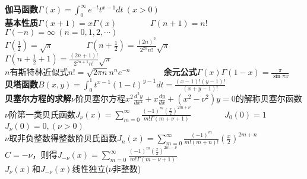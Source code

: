 \documentclass[10pt,a4paper]{article}
\begin{document}
\begin{multicols}{2}
\textbf{伽马函数}$\Gamma(x)=\int_0^{\infty}e^{-t}t^{x-1}dt~(x>0)$\\
\indent\textbf{基本性质}$\Gamma(x+1)=x\Gamma(x)$~~~~~~~~$\Gamma(n+1)=n!$~~~~~~~~$\Gamma(-n)=\infty~(n=0,1,2,\cdots)$\\
\indent\indent$\Gamma(\frac{1}{2})=\sqrt{\pi}$~~~~~~~~$\Gamma(n+\frac{1}{2})=\frac{(2n)^2}{2^{2n}n!}\sqrt{\pi}$~~~~~~~~$\Gamma(n+\frac{1}{2}+1)=\frac{(2n+1)!}{2^{2n+1}n!}\sqrt{\pi}$\\
\indent{}$n$有斯特林近似式$n!=\sqrt{2\pi n}n^ne^{-n}$~~~~~~~~\textbf{余元公式}$\Gamma(x)\Gamma(1-x)=\frac{\pi}{\sin\pi x}$\\
\textbf{贝塔函数}$B(x,y)=\int_0^1t^{x-1}(1-t)^{y-1}dt=\frac{(x-1)!(y-1)!}{(x+y-1)!}$\\
\textbf{贝塞尔方程的求解}$\nu$阶贝塞尔方程$x^2\frac{d^2y}{dx^2}+x\frac{dy}{dx}+(x^2-\nu^2)y=0$的解称贝塞尔函数\\
$\nu$阶第一类贝氏函数$J_{\nu}(x)=\sum_{m=0}^{\infty}\frac{(-1)^m(\frac{x}{2})^{2m+\nu}}{m!\Gamma(m+\nu+1)}$~~~~~~~~$J_0(0)=1$~~$J_{\nu}(0)=0,(\nu>0)$\\
\indent{}$\nu$取非负整数得整数阶贝氏函数$J_n(x)=\sum_{m=0}^{\infty}\frac{(-1)^m}{m!(m+n)!}(\frac{x}{2})^{2m+n}$\\
$C=-\nu$，则得$J_{-\nu}(x)=\sum_{m=0}^{\infty}\frac{(-1)^m(\frac{x}{2})^{2m-\nu}}{m!\Gamma(m-\nu+1)}$\\
\indent$J_{\nu}(x)$和$J_{-\nu}(x)$线性独立($\nu$非整数)

\end{multicols}
\end{document}
